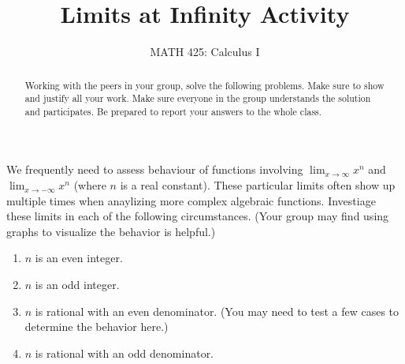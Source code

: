 \documentclass{ximera}
\title{Limits at Infinity Activity }
\author{MATH 425: Calculus I}
\begin{document}
\begin{abstract}
    Working with the peers in your group, solve the following problems. Make sure to show and justify all your work. Make sure everyone in the group understands the solution and participates. Be prepared to report your answers to the whole class. 
\end{abstract}
\maketitle

\begin{exercise}
  We frequently need to assess behaviour of functions involving $\lim_{x\rightarrow \infty}x^n$ and $\lim_{x\rightarrow -\infty}x^n$ (where $n$ is a real constant).  These particular limits often show up multiple times when anaylizing more complex algebraic functions.  Investiage these limits in each of the following circumstances. (Your group may find using graphs to visualize the behavior is helpful.)
  \begin{enumerate}
    \item $n$ is an even integer.
    \item $n$ is an odd integer.
    \item $n$ is rational with an even denominator. (You may need to test a few cases to determine the behavior here.)
    \item $n$ is rational with an odd denominator.
  \end{enumerate}
\end{exercise}
\end{document}
